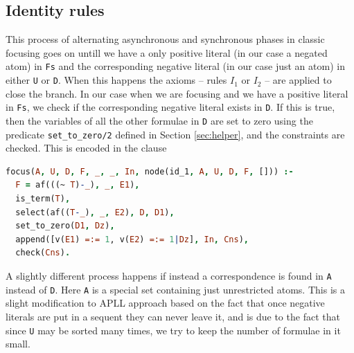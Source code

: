 \documentclass[a4paper, 12pt, tesi, english]{report}
\begin{document}
\subsection{Identity rules}
This process of alternating asynchronous and synchronous phases in classic focusing goes on untill we have a only positive literal (in our case a negated atom) in \texttt{Fs} and the corresponding negative literal (in our case just an atom) in either \texttt{U} or \texttt{D}.
When this happens the axioms -- rules $I_1$ or $I_2$ -- are applied to close the branch.
In our case when we are focusing and we have a positive literal in \texttt{Fs}, we check if the corresponding negative literal exists in \texttt{D}.
If this is true, then the variables of all the other formulae in \texttt{D} are set to zero using the predicate \texttt{set\_to\_zero/2} defined in Section \ref{sec:helper}, and the constraints are checked.
This is encoded in the clause 
\begin{lstlisting}[language=prolog]
focus(A, U, D, F, _, _, In, node(id_1, A, U, D, F, [])) :-
  F = af(((~ T)-_), _, E1),
  is_term(T),
  select(af((T-_), _, E2), D, D1),
  set_to_zero(D1, Dz),
  append([v(E1) =:= 1, v(E2) =:= 1|Dz], In, Cns),
  check(Cns).
\end{lstlisting}
A slightly different process happens if instead a correspondence is found in \texttt{A} instead of \texttt{D}.
Here \texttt{A} is a special set containing just unrestricted atoms.
This is a slight modification to APLL approach based on the fact that once negative literals are put in a sequent they can never leave it, and is due to the fact that since \texttt{U} may be sorted many times, we try to keep the number of formulae in it small.
\end{document}
